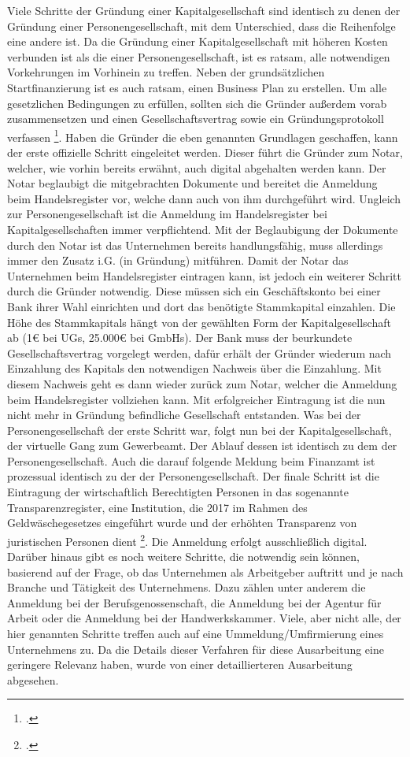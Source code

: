 Viele Schritte der Gründung einer Kapitalgesellschaft sind identisch zu denen der Gründung einer Personengesellschaft, mit dem Unterschied, dass die Reihenfolge eine andere ist. Da die Gründung einer Kapitalgesellschaft mit höheren Kosten verbunden ist als die einer Personengesellschaft, ist es ratsam, alle notwendigen Vorkehrungen im Vorhinein zu treffen. Neben der grundsätzlichen Startfinanzierung ist es auch ratsam, einen Business Plan zu erstellen. Um alle gesetzlichen Bedingungen zu erfüllen, sollten sich die Gründer außerdem vorab zusammensetzen und einen Gesellschaftsvertrag sowie ein Gründungsprotokoll verfassen \footcite{oa_gmbh-_nodate}. Haben die Gründer die eben genannten Grundlagen geschaffen, kann der erste offizielle Schritt eingeleitet werden. Dieser führt die Gründer zum Notar, welcher, wie vorhin bereits erwähnt, auch digital abgehalten werden kann. Der Notar beglaubigt die mitgebrachten Dokumente und bereitet die Anmeldung beim Handelsregister vor, welche dann auch von ihm durchgeführt wird. Ungleich zur Personengesellschaft ist die Anmeldung im Handelsregister bei Kapitalgesellschaften immer verpflichtend. Mit der Beglaubigung der Dokumente durch den Notar ist das Unternehmen bereits handlungsfähig, muss allerdings immer den Zusatz i.G. (in Gründung) mitführen. Damit der Notar das Unternehmen beim Handelsregister eintragen kann, ist jedoch ein weiterer Schritt durch die Gründer notwendig. Diese müssen sich ein Geschäftskonto bei einer Bank ihrer Wahl einrichten und dort das benötigte Stammkapital einzahlen. Die Höhe des Stammkapitals hängt von der gewählten Form der Kapitalgesellschaft ab (1€ bei UGs, 25.000€ bei GmbHs). Der Bank muss der beurkundete Gesellschaftsvertrag vorgelegt werden, dafür erhält der Gründer wiederum nach Einzahlung des Kapitals den notwendigen Nachweis über die Einzahlung. Mit diesem Nachweis geht es dann wieder zurück zum Notar, welcher die Anmeldung beim Handelsregister vollziehen kann. Mit erfolgreicher Eintragung ist die nun nicht mehr in Gründung befindliche Gesellschaft entstanden. Was bei der Personengesellschaft der erste Schritt war, folgt nun bei der Kapitalgesellschaft, der virtuelle Gang zum Gewerbeamt. Der Ablauf dessen ist identisch zu dem der Personengesellschaft. Auch die darauf folgende Meldung beim Finanzamt ist prozessual identisch zu der der Personengesellschaft. Der finale Schritt ist die Eintragung der wirtschaftlich Berechtigten Personen in das sogenannte Transparenzregister, eine Institution, die 2017 im Rahmen des Geldwäschegesetzes eingeführt wurde und der erhöhten Transparenz von juristischen Personen dient \footcite{oa_transparenzregister_nodate}. Die Anmeldung erfolgt ausschließlich digital. Darüber hinaus gibt es noch weitere Schritte, die notwendig sein können, basierend auf der Frage, ob das Unternehmen als Arbeitgeber auftritt und je nach Branche und Tätigkeit des Unternehmens. Dazu zählen unter anderem die Anmeldung bei der Berufsgenossenschaft, die Anmeldung bei der Agentur für Arbeit oder die Anmeldung bei der Handwerkskammer. Viele, aber nicht alle, der hier genannten Schritte treffen auch auf eine Ummeldung/Umfirmierung eines Unternehmens zu. Da die Details dieser Verfahren für diese Ausarbeitung eine geringere Relevanz haben, wurde von einer detaillierteren Ausarbeitung abgesehen.